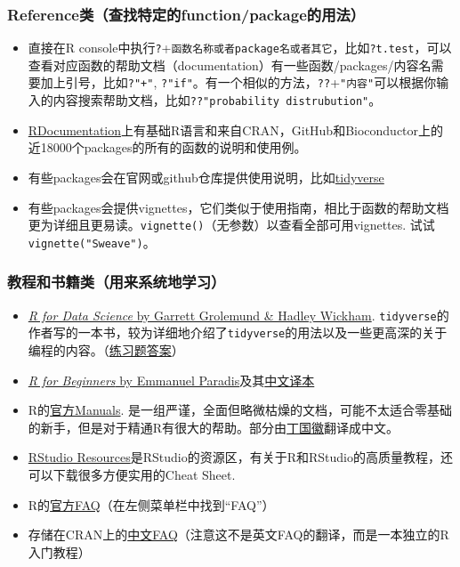 \documentclass[]{book}
\providecommand{\tightlist}{%
  \setlength{\itemsep}{0pt}\setlength{\parskip}{0pt}}
\begin{document}
\hypertarget{reference}{%
\subsubsection{Reference类（查找特定的function/package的用法）}\label{reference}}

\begin{itemize}
\tightlist
\item
  直接在R console中执行\texttt{?}+\texttt{函数名称或者package名或者其它}，比如\texttt{?t.test}，可以查看对应函数的帮助文档（documentation）有一些函数/packages/内容名需要加上引号，比如\texttt{?"+"}, \texttt{?"if"}。有一个相似的方法，\texttt{??}+\texttt{"内容"}可以根据你输入的内容搜索帮助文档，比如\texttt{??"probability\ distrubution"}。
\item
  \href{https://www.rdocumentation.org}{RDocumentation}上有基础R语言和来自CRAN，GitHub和Bioconductor上的近18000个packages的所有的函数的说明和使用例。
\item
  有些packages会在官网或github仓库提供使用说明，比如\href{https://www.tidyverse.org}{tidyverse}
\item
  有些packages会提供vignettes，它们类似于使用指南，相比于函数的帮助文档更为详细且更易读。\texttt{vignette()}（无参数）以查看全部可用vignettes. 试试\texttt{vignette("Sweave")}。
\end{itemize}

\hypertarget{manual-type}{%
\subsubsection{教程和书籍类（用来系统地学习）}\label{manual-type}}

\begin{itemize}
\tightlist
\item
  \href{https://r4ds.had.co.nz}{\emph{R for Data Science} by Garrett Grolemund \& Hadley Wickham}. \texttt{tidyverse}的作者写的一本书，较为详细地介绍了\texttt{tidyverse}的用法以及一些更高深的关于编程的内容。（\href{https://jrnold.github.io/r4ds-exercise-solutions/}{练习题答案}）
\item
  \href{https://cran.r-project.org/doc/contrib/Paradis-rdebuts_en.pdf}{\emph{R for Beginners} by Emmanuel Paradis}及其\href{https://github.com/DingGuohui/R-for-beginer/blob/master/rdebuts_cn\%200.2.pdf}{中文译本}
\item
  R的\href{https://cran.r-project.org/manuals.html}{官方Manuals}.
  是一组严谨，全面但略微枯燥的文档，可能不太适合零基础的新手，但是对于精通R有很大的帮助。部分由\href{https://github.com/dingguohui}{丁国徽}翻译成中文。
\item
  \href{https://resources.rstudio.com}{RStudio Resources}是RStudio的资源区，有关于R和RStudio的高质量教程，还可以下载很多方便实用的Cheat Sheet.
\item
  R的\href{https://cran.r-project.org}{官方FAQ}（在左侧菜单栏中找到``FAQ''）
\item
  存储在CRAN上的\href{https://cran.r-project.org/doc/contrib/Liu-FAQ.pdf}{中文FAQ}（注意这不是英文FAQ的翻译，而是一本独立的R入门教程）
\end{itemize}
\end{document}

